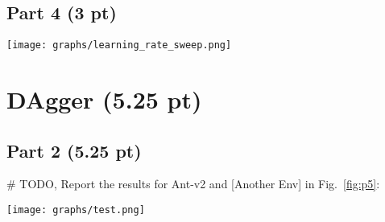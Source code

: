 \documentclass{article}
\newcommand{\fref}[1]{Fig.~\ref{#1}}
\begin{document}
\subsection{Part 4 (3 pt)}
\begin{figure*}[!h]
	\centering
\texttt{[image: graphs/learning\_rate\_sweep.png]}
	\caption{The graph shows mean return $\pm$ standard deviation of the BC Agent in Ant-v2 environment over approximately 5 rollouts for each learning rate value: 1e-4, 5e-4, 1e-3, 5e-3, 1e-2 and 5e-2.
  Rest of the hyperparameters are same as in 1.2.
  Learning rate was chosen because it controls the gradient step size and can impact both convergence speed and final performance, as can be seen from the graph.
  }
	\label{fig:p4}
\end{figure*}

\section{DAgger (5.25 pt)}
\subsection{Part 2 (5.25 pt)}
\# TODO, Report the results for Ant-v2 and [Another Env] in \fref{fig:p5}:
\begin{figure*}[!h]
	\centering
	\texttt{[image: graphs/test.png]}
	\caption{Learning curve, plotting the number of DAgger iterations vs. the policy’s mean return, with error bars to show the standard deviation. Please show the Ant-v2 environment results on the left and the results from [Another Env] on the right.}
	\label{fig:p5}
\end{figure*}
\end{document}
